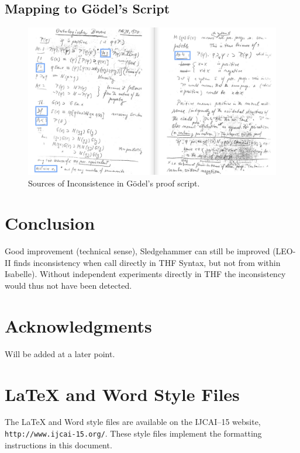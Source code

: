 \documentclass{article}
\begin{document}
\subsection{Mapping to Gödel's Script}
\begin{figure}
\centerline{\includegraphics[width=\textwidth]{./Images/Manuscript2.png}}
\caption{Sources of Inconsistence in G\"{o}del's proof script.} \label{GoedelScript}
\end{figure}


\section{Conclusion}


Good improvement (technical sense), Sledgehammer can still be improved
(LEO-II finds inconsistency when call directly in THF Syntax, but not
from within Isabelle). Without independent experiments directly in THF 
the inconsistency would thus not have been detected.

\section*{Acknowledgments}

Will be added at a later point.


\appendix

\section{\LaTeX{} and Word Style Files}\label{stylefiles}

The \LaTeX{} and Word style files are available on the IJCAI--15
website, {\tt http://www.ijcai-15.org/}.
These style files implement the formatting instructions in this
document.
\end{document}
